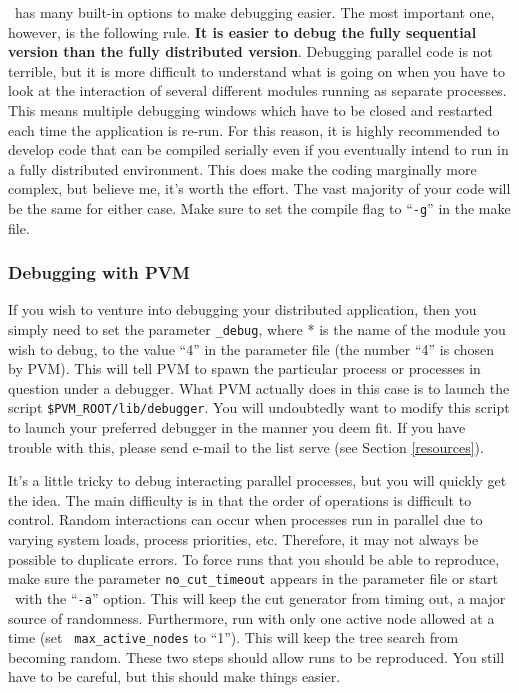 \BB\ has many built-in options to make debugging easier. The most
important one, however, is the following rule. {\bf It is easier to
debug the fully sequential version than the fully distributed
version}. Debugging parallel code is not terrible, but it is more
difficult to understand what is going on when you have to look at the
interaction of several different modules running as separate
processes. This means multiple debugging windows which have to be
closed and restarted each time the application is re-run. For this
reason, it is highly recommended to develop code that can be compiled
serially even if you eventually intend to run in a fully distributed
environment. This does make the coding marginally more complex, but
believe me, it's worth the effort. The vast majority of your code will
be the same for either case. Make sure to set the compile flag to
``{\tt -g}'' in the make file.

\subsubsection{Debugging with PVM}
\label{debugging-PVM}
If you wish to venture into debugging your distributed application,
then you simply need to set the parameter {\tt *\_debug}, where * is
the name of the module you wish to debug, 
to the value ``4'' in the parameter file (the number ``4'' is chosen
by PVM). This will tell PVM to spawn the particular process or
processes in question under a debugger. What PVM actually does in this
case is to launch the script {\tt \$PVM\_ROOT/lib/debugger}. You will
undoubtedly want to modify this script to launch your preferred
debugger in the manner you deem fit. If you have trouble with this,
please send e-mail to the list serve (see Section \ref{resources}).

It's a little tricky to debug interacting parallel processes, but you
will quickly get the idea. The main difficulty is in that the order of
operations is difficult to control. Random interactions can occur when
processes run in parallel due to varying system loads, process
priorities, etc. Therefore, it may not always be possible to duplicate
errors. To force runs that you should be able to reproduce, make sure
the parameter {\tt no\_cut\_timeout} appears in the parameter file or
start \BB\ with the ``{\tt -a}'' option. This will keep the cut
generator from timing out, a major source of randomness. Furthermore,
run with only one active node allowed at a time (set {\tt
max\_active\_nodes} to ``1''). This will keep the tree search from
becoming random. These two steps should allow runs to be reproduced.
You still have to be careful, but this should make things easier.

